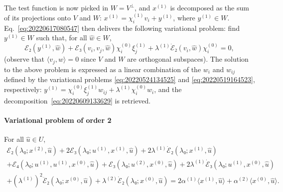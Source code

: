 \documentclass[12pt, final]{scrartcl}
\theoremstyle{definition}
\newcommand{\E}{\mathcal E}
\newcommand{\order}[2][1]{#2^{(#1)}}
\begin{document}
The test function is now picked in $W = V^\perp$, and $\order[1]x$ is
decomposed as the sum of its projections onto $V$ and $W$:
$\order[1]x = \order[1]{χ_i} v_i + \order[1]{y}$, where $\order[1]y ∈
W$. Eq.~\eqref{eq:20220617080547} then delivers the following variational
problem: find $\order[1]y ∈ W$ such that, for all $\hat{w} ∈ W$,
\begin{equation}
  \E₂(\order[1]y, \hat{w}) + \E₃(v_i, v_j, \hat{w}) \order[0]{χ_i} \order[1]{ξ_j} + \order[1]\lambda \dot{\E}₂(v_i, \hat{w}) \order[0]{χ_i} = 0,
\end{equation}
(observe that $〈 v_j, \hat{w} 〉 = 0$ since $V$ and $W$ are orthogonal
subspaces). The solution to the above problem is expressed as a linear
combination of the $w_i$ and $w_{ij}$ defined by the variational problems
\eqref{eq:20220524134525} and \eqref{eq:20220519164523}, respectively:
$\order[1]y = \order[0]{χ_i} \order[1]{ξ_j} w_{i j} + \order[1]\lambda \order[0]{χ_i}
w_i$, and the decomposition~\eqref{eq:20220609133629} is retrieved.

\paragraph{Variational problem of order 2} For all $\hat{u} ∈ U$,
\begin{multline*}
    \E₂(\lambda₀; \order[2]x, \hat{u})
    + 2\E₃(\lambda₀; \order[1]u, \order[1]x, \hat{u})
    + 2 \order[1]\lambda \dot{\E}₂(\lambda₀; \order[1]x, \hat{u})\\
    + \E₄(\lambda₀; \order[1]u, \order[1]u, \order[0]x, \hat{u})
    + \E₃(\lambda₀; \order[2]u, \order[0]x, \hat{u})
    + 2\order[1]\lambda \dot{\E}₃(\lambda₀; \order[1]u, \order[0]x, \hat{u})\\
    + ( \order[1]\lambda )^2 \ddot{\E}₂(\lambda₀; \order[0]x, \hat{u})
    + \order[2]\lambda \dot{\E}₂(\lambda₀; \order[0]x, \hat{u})
    = 2 \order[1]α 〈 \order[1]x, \hat{u} 〉
    + \order[2]α 〈 \order[0]x, \hat{u} 〉.
\end{multline*}
\end{document}
